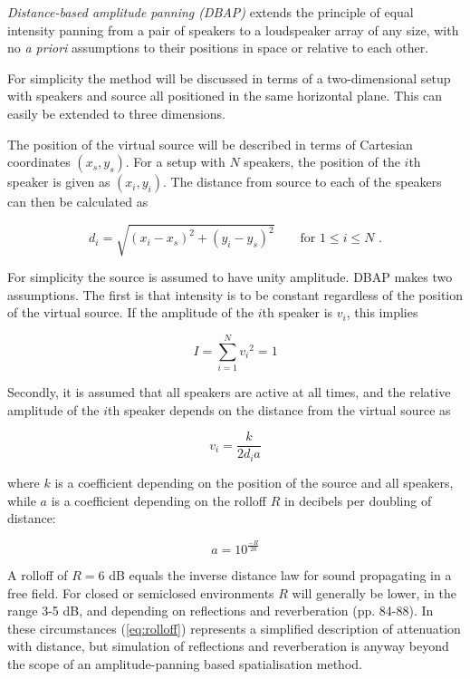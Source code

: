 \documentclass[twoside,10pt]{article}
\begin{document}
\textit{Distance-based amplitude panning (DBAP)} extends the principle of equal intensity panning from a pair of speakers to a loudspeaker array of any size, with no \textit{a priori} assumptions to their positions in space or relative to each other.

For simplicity the method will be discussed in terms of a two-dimensional setup with speakers and source all positioned in the same horizontal plane. This can easily be extended to three dimensions.

The position of the virtual source will be described in terms of Cartesian coordinates $(x_{s}, y_{s})$. For a setup with $N$ speakers, the position of the $i$th speaker is given as $(x_{i}, y_{i})$. The distance from source to each of the speakers can then be calculated as

\begin{equation} \label{eq:distance}
d_{i} = \sqrt{ {(x_{i} - x_{s})}^2 + {(y_{i} - y_{s})}^2 } \qquad \textrm{for } 1 \leq i \leq N \textrm{ .}
\end{equation}

For simplicity the source is assumed to have unity amplitude. DBAP makes two assumptions. The first is that intensity is to be constant regardless of the position of the virtual source. If the amplitude of the $i$th speaker is $v_{i}$, this implies

\begin{equation} \label{eq:constant_intensity}
I = \sum_{i=1}^{N} {v_{i}}^2 = 1
\end{equation}

Secondly, it is assumed that all speakers are active at all times, and the relative amplitude of the $i$th speaker depends on the distance from the virtual source as 

\begin{equation} \label{eq:inverse_distance}
v_{i} = \frac{k}{2 d_{i} a} 
\end{equation}

where $k$ is a coefficient depending on the position of the source and all speakers, while $a$ is a coefficient depending on the rolloff $R$ in decibels per doubling of distance:

\begin{equation} \label{eq:rolloff}
	a = 10^{\frac{-R}{20}}
\end{equation}

A rolloff of $R = 6$ dB equals the inverse distance law for sound propagating in a free field. For closed or semiclosed environments $R$ will generally be lower, in the range 3-5 dB, and depending on reflections and reverberation \cite{Everest:2000handbook_acoustics} (pp. 84-88). In these circumstances (\ref{eq:rolloff}) represents a simplified description of attenuation with distance, but simulation of reflections and reverberation is anyway beyond the scope of an amplitude-panning based spatialisation method.
\end{document}
